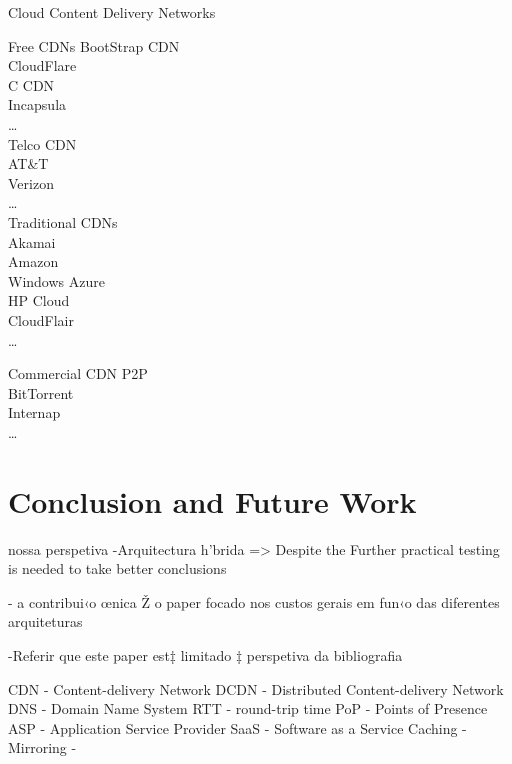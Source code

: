 \documentclass{llncs}
\begin{document}
\if
	Cloud Content Delivery Networks
	
		Free CDNs
			BootStrap CDN\\
			CloudFlare\\
			C CDN\\
			Incapsula\\
			\dots\\
		Telco CDN\\
			AT\&T\\
			Verizon\\
			\dots\\
		Traditional CDNs\\
			Akamai\\
				Amazon\\
			Windows Azure\\
			HP Cloud\\
			CloudFlair\\
			\dots 

		Commercial CDN P2P\\
			BitTorrent\\
			Internap\\
			\dots\\
\fi




\section{Conclusion and Future Work}						%





nossa perspetiva
-Arquitectura h’brida => Despite the  Further practical testing is needed to take better conclusions

- a contribui‹o œnica Ž o paper focado nos custos gerais em fun‹o das diferentes arquiteturas

-Referir que este paper est‡ limitado ‡ perspetiva da bibliografia


\if
	CDN - Content-delivery Network
	DCDN - Distributed Content-delivery Network
	DNS - Domain Name System
	RTT - round-trip time
	PoP - Points of Presence
	ASP - Application Service Provider
	SaaS - Software as a Service
	Caching -
	Mirroring -
\fi	
\end{document}
